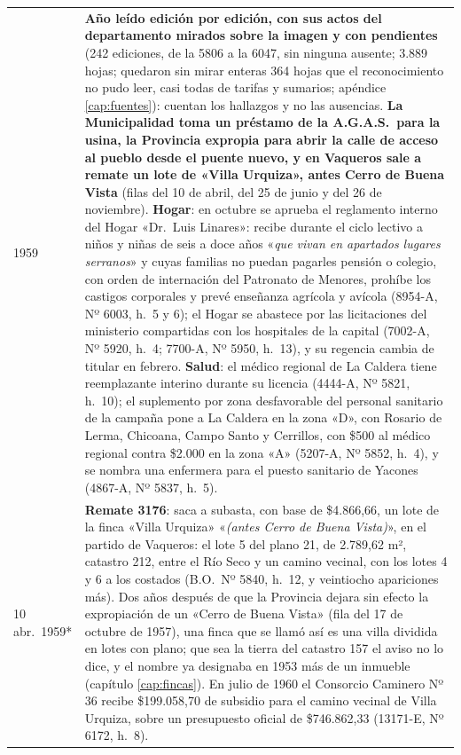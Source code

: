 \begin{longtable}{@{}p{2.7cm}p{10.3cm}@{}}
1959 & \textbf{Año leído edición por edición, con sus actos del departamento mirados sobre la imagen y con pendientes} (242 ediciones, de la 5806 a la 6047, sin ninguna ausente; 3.889 hojas; quedaron sin mirar enteras 364 hojas que el reconocimiento no pudo leer, casi todas de tarifas y sumarios; apéndice \ref{cap:fuentes}): cuentan los hallazgos y no las ausencias. \textbf{La Municipalidad toma un préstamo de la A.G.A.S.\ para la usina, la Provincia expropia para abrir la calle de acceso al pueblo desde el puente nuevo, y en Vaqueros sale a remate un lote de «Villa Urquiza», antes Cerro de Buena Vista} (filas del 10 de abril, del 25 de junio y del 26 de noviembre). \textbf{Hogar}: en octubre se aprueba el reglamento interno del Hogar «Dr.\ Luis Linares»: recibe durante el ciclo lectivo a niños y niñas de seis a doce años «\textit{que vivan en apartados lugares serranos}» y cuyas familias no puedan pagarles pensión o colegio, con orden de internación del Patronato de Menores, prohíbe los castigos corporales y prevé enseñanza agrícola y avícola (8954-A, Nº 6003, h.\ 5 y 6); el Hogar se abastece por las licitaciones del ministerio compartidas con los hospitales de la capital (7002-A, Nº 5920, h.\ 4; 7700-A, Nº 5950, h.\ 13), y su regencia cambia de titular en febrero. \textbf{Salud}: el médico regional de La Caldera tiene reemplazante interino durante su licencia (4444-A, Nº 5821, h.\ 10); el suplemento por zona desfavorable del personal sanitario de la campaña pone a La Caldera en la zona «D», con Rosario de Lerma, Chicoana, Campo Santo y Cerrillos, con \$500 al médico regional contra \$2.000 en la zona «A» (5207-A, Nº 5852, h.\ 4), y se nombra una enfermera para el puesto sanitario de Yacones (4867-A, Nº 5837, h.\ 5). \\
10 abr.\ 1959* & \textbf{Remate 3176}: saca a subasta, con base de \$4.866,66, un lote de la finca «Villa Urquiza» «\textit{(antes Cerro de Buena Vista)}», en el partido de Vaqueros: el lote 5 del plano 21, de 2.789,62 m², catastro 212, entre el Río Seco y un camino vecinal, con los lotes 4 y 6 a los costados (B.O.\ Nº 5840, h.\ 12, y veintiocho apariciones más). Dos años después de que la Provincia dejara sin efecto la expropiación de un «Cerro de Buena Vista» (fila del 17 de octubre de 1957), una finca que se llamó así es una villa dividida en lotes con plano; que sea la tierra del catastro 157 el aviso no lo dice, y el nombre ya designaba en 1953 más de un inmueble (capítulo \ref{cap:fincas}). En julio de 1960 el Consorcio Caminero Nº 36 recibe \$199.058,70 de subsidio para el camino vecinal de Villa Urquiza, sobre un presupuesto oficial de \$746.862,33 (13171-E, Nº 6172, h.\ 8). \\

\end{longtable}
